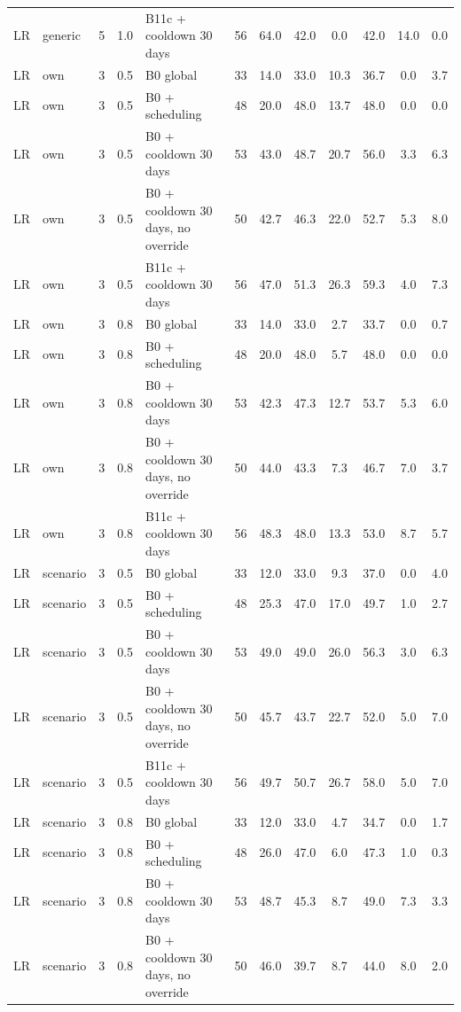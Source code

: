 \documentclass[10pt,onecolumn,letterpaper]{article}
\begin{document}
\begin{longtable}{lllllccccccc}
LR & generic & 5 & 1.0 & B11c + cooldown 30 days & 56 & 64.0 & 42.0 & 0.0 & 42.0 & 14.0 & 0.0 \\
LR & own & 3 & 0.5 & B0 global & 33 & 14.0 & 33.0 & 10.3 & 36.7 & 0.0 & 3.7 \\
LR & own & 3 & 0.5 & B0 + scheduling & 48 & 20.0 & 48.0 & 13.7 & 48.0 & 0.0 & 0.0 \\
LR & own & 3 & 0.5 & B0 + cooldown 30 days & 53 & 43.0 & 48.7 & 20.7 & 56.0 & 3.3 & 6.3 \\
LR & own & 3 & 0.5 & B0 + cooldown 30 days, no override & 50 & 42.7 & 46.3 & 22.0 & 52.7 & 5.3 & 8.0 \\
LR & own & 3 & 0.5 & B11c + cooldown 30 days & 56 & 47.0 & 51.3 & 26.3 & 59.3 & 4.0 & 7.3 \\
LR & own & 3 & 0.8 & B0 global & 33 & 14.0 & 33.0 & 2.7 & 33.7 & 0.0 & 0.7 \\
LR & own & 3 & 0.8 & B0 + scheduling & 48 & 20.0 & 48.0 & 5.7 & 48.0 & 0.0 & 0.0 \\
LR & own & 3 & 0.8 & B0 + cooldown 30 days & 53 & 42.3 & 47.3 & 12.7 & 53.7 & 5.3 & 6.0 \\
LR & own & 3 & 0.8 & B0 + cooldown 30 days, no override & 50 & 44.0 & 43.3 & 7.3 & 46.7 & 7.0 & 3.7 \\
LR & own & 3 & 0.8 & B11c + cooldown 30 days & 56 & 48.3 & 48.0 & 13.3 & 53.0 & 8.7 & 5.7 \\
LR & scenario & 3 & 0.5 & B0 global & 33 & 12.0 & 33.0 & 9.3 & 37.0 & 0.0 & 4.0 \\
LR & scenario & 3 & 0.5 & B0 + scheduling & 48 & 25.3 & 47.0 & 17.0 & 49.7 & 1.0 & 2.7 \\
LR & scenario & 3 & 0.5 & B0 + cooldown 30 days & 53 & 49.0 & 49.0 & 26.0 & 56.3 & 3.0 & 6.3 \\
LR & scenario & 3 & 0.5 & B0 + cooldown 30 days, no override & 50 & 45.7 & 43.7 & 22.7 & 52.0 & 5.0 & 7.0 \\
LR & scenario & 3 & 0.5 & B11c + cooldown 30 days & 56 & 49.7 & 50.7 & 26.7 & 58.0 & 5.0 & 7.0 \\
LR & scenario & 3 & 0.8 & B0 global & 33 & 12.0 & 33.0 & 4.7 & 34.7 & 0.0 & 1.7 \\
LR & scenario & 3 & 0.8 & B0 + scheduling & 48 & 26.0 & 47.0 & 6.0 & 47.3 & 1.0 & 0.3 \\
LR & scenario & 3 & 0.8 & B0 + cooldown 30 days & 53 & 48.7 & 45.3 & 8.7 & 49.0 & 7.3 & 3.3 \\
LR & scenario & 3 & 0.8 & B0 + cooldown 30 days, no override & 50 & 46.0 & 39.7 & 8.7 & 44.0 & 8.0 & 2.0 \\

\end{longtable}
\end{document}
